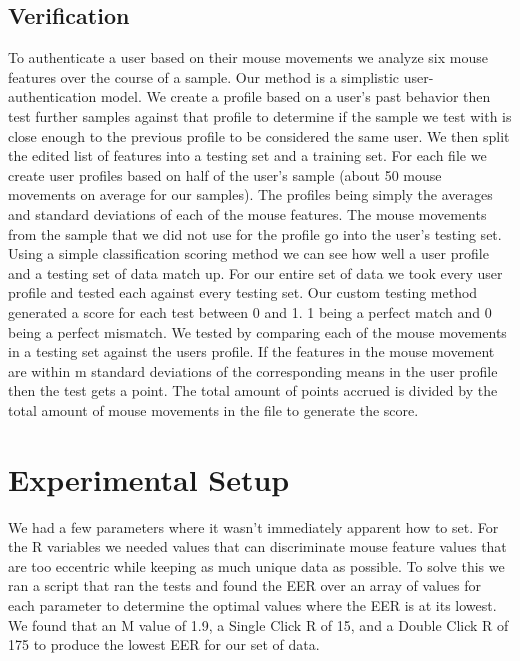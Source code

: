 \documentclass[conference]{IEEEtran}
\begin{document}
\subsection{Verification}
	To authenticate a user based on their mouse movements we analyze six mouse features over the course of a sample. Our method is a simplistic user-authentication model. We create a profile based on a user's past behavior then test further samples against that profile to determine if the sample we test with is close enough to the previous profile to be considered the same user.  
We then split the edited list of features into a testing set and a training set. For each file we create user profiles based on half of the user's sample (about 50 mouse movements on average for our samples). The profiles being simply the averages and standard deviations of each of the mouse features. The mouse movements from the sample that we did not use for the profile go into the user's testing set.
Using a simple classification scoring method we can see how well a user profile and a testing set of data match up. For our entire set of data we took every user profile and tested each against every testing set. Our custom testing method generated a score for each test between 0 and 1. 1 being a perfect match and 0 being a perfect mismatch.
We tested by comparing each of the mouse movements in a testing set against the users profile. If the features in the mouse movement are within m standard deviations of the corresponding means in the user profile then the test gets a point. The total amount of points accrued is divided by the total amount of mouse movements in the file to generate the score.
	


\section{Experimental Setup}
We had a few parameters where it wasn’t immediately apparent how to set. For the R variables we needed values that can discriminate mouse feature values that are too eccentric while keeping as much unique data as possible. To solve this we ran a script that ran the tests and found the EER over an array of values for each parameter to determine the optimal values where the EER is at its lowest. We found that an M value of 1.9, a Single Click R of 15, and a Double Click R of 175 to produce the lowest EER for our set of data.

\bgroup
\def\arraystretch{1.5}
\egroup
{}
\end{document}
